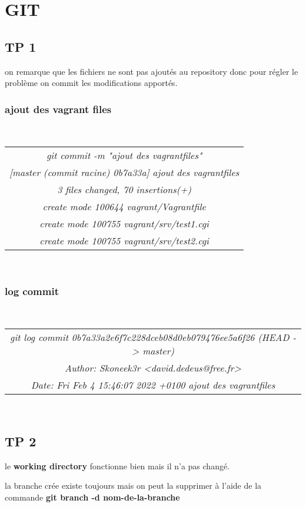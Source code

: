 \documentclass{report}
\begin{document}
\chapter{GIT}

\section{TP 1}
on remarque que les fichiers ne sont pas ajoutés au repository donc pour régler le problème 
on commit les modifications apportés.

\subsection{ajout des vagrant files}
\\
\begin{tabular}{|c|}
\hline
\textit{git commit -m "ajout des vagrantfiles"}\\
\textit{[master (commit racine) 0b7a33a] ajout des vagrantfiles} \\
\textit{ 3 files changed, 70 insertions(+)} \\
\textit{ create mode 100644 vagrant/Vagrantfile}\\
\textit{ create mode 100755 vagrant/srv/test1.cgi}\\
\textit{ create mode 100755 vagrant/srv/test2.cgi}\\
\hline
\end{tabular}
\\
\subsection{log commit}
\\
\begin{tabular}{|c|}
\hline
\textit{git log commit 0b7a33a2e6f7c228dceb08d0eb079476ee5a6f26 (HEAD -> master)}\\
\textit{Author: Skoneek3r <david.dedeus@free.fr>}\\
\textit{Date:   Fri Feb 4 15:46:07 2022 +0100 ajout des vagrantfiles}\\
\hline
\end{tabular}
\\
\section{TP 2}
le \textbf{working directory} fonctionne bien mais il n'a pas changé.

la branche crée existe toujours mais on peut la supprimer à l'aide de la commande 
\textbf{git branch -d nom-de-la-branche}
\end{document}
